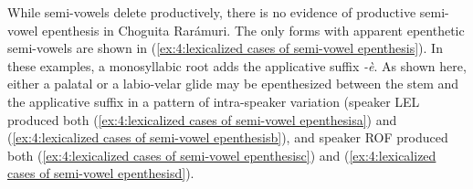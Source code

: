     \z
\z

While semi-vowels delete productively, there is no evidence of productive semi-vowel epenthesis in Choguita Rarámuri. The only forms with apparent epenthetic semi-vowels are shown in (\ref{ex:4:lexicalized cases of semi-vowel epenthesis}). In these examples, a monosyllabic root adds the applicative suffix \textit{-è}. As shown here, either a palatal or a labio-velar glide may be epenthesized between the stem and the applicative suffix in a pattern of intra-speaker variation (speaker LEL produced both (\ref{ex:4:lexicalized cases of semi-vowel epenthesisa}) and (\ref{ex:4:lexicalized cases of semi-vowel epenthesisb}), and speaker ROF produced both (\ref{ex:4:lexicalized cases of semi-vowel epenthesisc}) and (\ref{ex:4:lexicalized cases of semi-vowel epenthesisd}).


